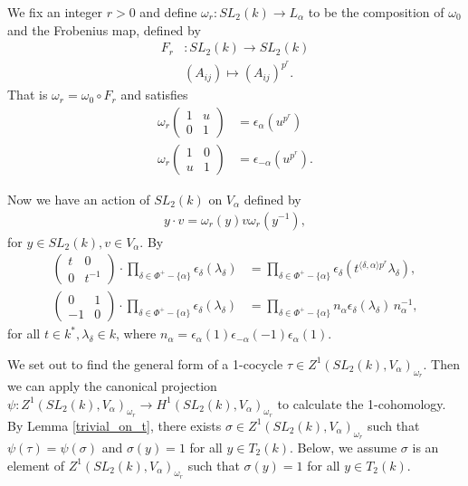 We fix an integer $r > 0$ and define $\omega_r:SL_2(k) \rightarrow L_\alpha$ to be the composition of $\omega_0$ and the Frobenius map, defined by
\begin{align*}
F_r&:SL_2(k)\rightarrow SL_2(k) \\
& (A_{ij}) \mapsto (A_{ij})^{p^r}.
\end{align*}
That is $\omega_r = \omega_0 \circ F_r$ and satisfies
\begin{align*}
\omega_r \left(\begin{matrix} 1 &  u \\ 0 & 1 \end{matrix} \right) &= \epsilon_\alpha(u^{p^r}) \\
\omega_r \left(\begin{matrix} 1 & 0 \\ u & 1 \end{matrix} \right) &= \epsilon_{-\alpha}(u^{p^r}).
\end{align*}

Now we have an action of $SL_2(k)$ on $V_\alpha$ defined by
\begin{align*}
	y \cdot v = \omega_r(y)v\omega_r(y^{-1}),
\end{align*}
for $y \in SL_2(k), v \in V_\alpha$. By \cite[Theorem 26.3(c)]{humphreys1975linear}
\begin{align}
	\label{eqn:t_act}
	\left(\begin{matrix} t & 0 \\ 0 & t^{-1}\end{matrix}\right) \cdot \prod_{\delta\in\Phi^+-\{\alpha\}} \epsilon_\delta (\lambda_\delta) &=
	\prod_{\delta\in\Phi^+-\{\alpha\}} \epsilon_\delta\left(t^{\langle \delta, \alpha \rangle p^r} \lambda_\delta\right), \\ 
	\label{eqn:n_act}
	\left(\begin{matrix} 0 & 1 \\ -1 & 0 \end{matrix}\right) \cdot \prod_{\delta\in\Phi^+-\{\alpha\}}\epsilon_\delta (\lambda_\delta) &=
	\prod_{\delta\in\Phi^+-\{\alpha\}} n_\alpha \epsilon_\delta \left( \lambda_\delta\right)\, n_\alpha^{-1},
\end{align}
for all $t \in k^*, \lambda_\delta \in k$, where $n_\alpha = \epsilon_\alpha(1)\epsilon_{-\alpha}(-1)\epsilon_\alpha(1)$.

We set out to find the general form of a 1-cocycle $\tau \in Z^1(SL_2(k), V_\alpha)_{\omega_r}$. Then we can apply the canonical projection $\psi:Z^1(SL_2(k), V_\alpha)_{\omega_r} \rightarrow H^1(SL_2(k), V_\alpha)_{\omega_r}$ to calculate the 1-cohomology.
By Lemma \ref{trivial_on_t}, there exists $\sigma \in Z^1(SL_2(k), V_\alpha)_{\omega_r}$ such that $\psi(\tau) = \psi(\sigma)$ and $\sigma\left(y\right) = 1$ for all $y\in T_2(k)$. Below, we assume $\sigma$ is an element of $Z^1(SL_2(k), V_\alpha)_{\omega_r}$ such that $\sigma(y) = 1$ for all $y\in T_2(k)$.

